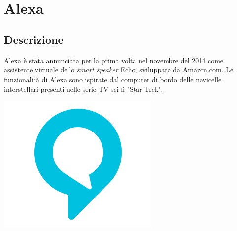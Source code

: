 \documentclass[a4paper,titlepage]{article}
\begin{document}
\newpage
	\section{Alexa}
	\subsection{Descrizione}
	\begin{minipage}{0.7\textwidth}\raggedright
		Alexa è stata annunciata per la prima volta nel novembre del 2014 come assistente virtuale dello \textit{smart speaker} Echo, sviluppato da Amazon.com.
		Le funzionalità di Alexa sono ispirate dal computer di bordo delle navicelle interstellari presenti nelle serie TV sci-fi "Star Trek".

	\end{minipage}
	\hfill
	\noindent\begin{minipage}{0.1\textwidth}
		\includegraphics[scale=0.3]{images/alexa.png}
	\end{minipage}
\end{document}
